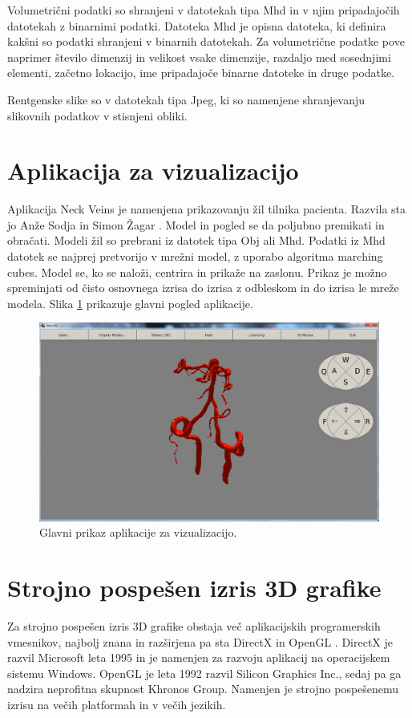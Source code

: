 \documentclass[a4paper, 12pt]{book}
\begin{document}
Volumetrični podatki so shranjeni v datotekah tipa Mhd\cite{mhd} in v njim pripadajočih datotekah z binarnimi podatki. Datoteka Mhd je opisna datoteka, ki definira kakšni so podatki shranjeni v binarnih datotekah. Za volumetrične podatke pove naprimer število dimenzij in velikost vsake dimenzije, razdaljo med sosednjimi elementi, začetno lokacijo, ime pripadajoče binarne datoteke in druge podatke.

Rentgenske slike so v datotekah tipa Jpeg, ki so namenjene shranjevanju slikovnih podatkov v stisnjeni obliki.

\section{Aplikacija za vizualizacijo}

Aplikacija Neck Veins je namenjena prikazovanju žil tilnika pacienta. Razvila sta jo Anže Sodja \cite{sodja} in Simon Žagar \cite{zagar}. Model in pogled se da poljubno premikati in obračati. Modeli žil so prebrani iz datotek tipa Obj ali Mhd. Podatki iz Mhd datotek se najprej pretvorijo v mrežni model, z uporabo algoritma marching cubes.  Model se, ko se naloži, centrira in prikaže na zaslonu. Prikaz je možno spreminjati od čisto osnovnega izrisa do izrisa z odbleskom in do izrisa le mreže modela. Slika \ref{aplikacija} prikazuje glavni pogled aplikacije. 

\begin{figure}[h!]
\begin{center}
\includegraphics[width=13.5cm]{Aplikacija.png}
\end{center}
\caption{Glavni prikaz aplikacije za vizualizacijo.}
\label{aplikacija}
\end{figure}

\section{Strojno pospešen izris 3D grafike}
Za strojno pospešen izris 3D grafike obstaja več aplikacijskih programerskih vmesnikov, najbolj znana in razširjena pa sta DirectX \cite{DirectX} in OpenGL \cite{OpenGL}. DirectX je razvil Microsoft leta 1995 in je namenjen za razvoju aplikacij na operacijskem sistemu Windows. OpenGL je leta 1992 razvil Silicon Graphics Inc., sedaj pa ga nadzira neprofitna skupnost Khronos Group. Namenjen je strojno pospešenemu izrisu na večih platformah in v večih jezikih. 
\end{document}
